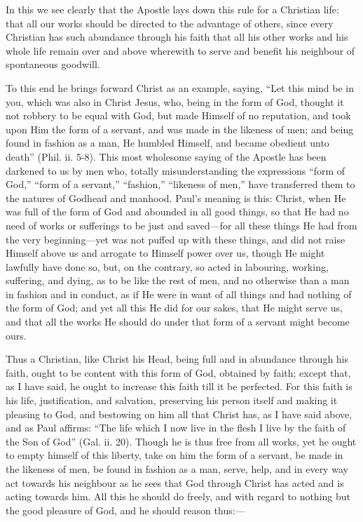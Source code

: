In this we see clearly that the Apostle lays down this rule for a
Christian life: that all our works should be directed to the advantage of
others, since every Christian has such abundance through his faith that
all his other works and his whole life remain over and above wherewith to
serve and benefit his neighbour of spontaneous goodwill.

To this end he brings forward Christ as an example, saying, ``Let this mind
be in you, which was also in Christ Jesus, who, being in the form of God,
thought it not robbery to be equal with God, but made Himself of no
reputation, and took upon Him the form of a servant, and was made in the
likeness of men; and being found in fashion as a man, He humbled Himself,
and became obedient unto death'' (Phil. ii. 5-8). This most wholesome
saying of the Apostle has been darkened to us by men who, totally
misunderstanding the expressions ``form of God,'' ``form of a servant,''
``fashion,'' ``likeness of men,'' have transferred them to the natures of
Godhead and manhood. Paul's meaning is this: Christ, when He was full of
the form of God and abounded in all good things, so that He had no need of
works or sufferings to be just and saved—for all these things He had
from the very beginning—yet was not puffed up with these things, and
did not raise Himself above us and arrogate to Himself power over us,
though He might lawfully have done so, but, on the contrary, so acted in
labouring, working, suffering, and dying, as to be like the rest of men,
and no otherwise than a man in fashion and in conduct, as if He were in
want of all things and had nothing of the form of God; and yet all this He
did for our sakes, that He might serve us, and that all the works He
should do under that form of a servant might become ours.

Thus a Christian, like Christ his Head, being full and in abundance
through his faith, ought to be content with this form of God, obtained by
faith; except that, as I have said, he ought to increase this faith till
it be perfected. For this faith is his life, justification, and salvation,
preserving his person itself and making it pleasing to God, and bestowing
on him all that Christ has, as I have said above, and as Paul affirms:
``The life which I now live in the flesh I live by the faith of the Son of
God'' (Gal. ii. 20). Though he is thus free from all works, yet he ought to
empty himself of this liberty, take on him the form of a servant, be made
in the likeness of men, be found in fashion as a man, serve, help, and in
every way act towards his neighbour as he sees that God through Christ has
acted and is acting towards him. All this he should do freely, and with
regard to nothing but the good pleasure of God, and he should reason thus:—

